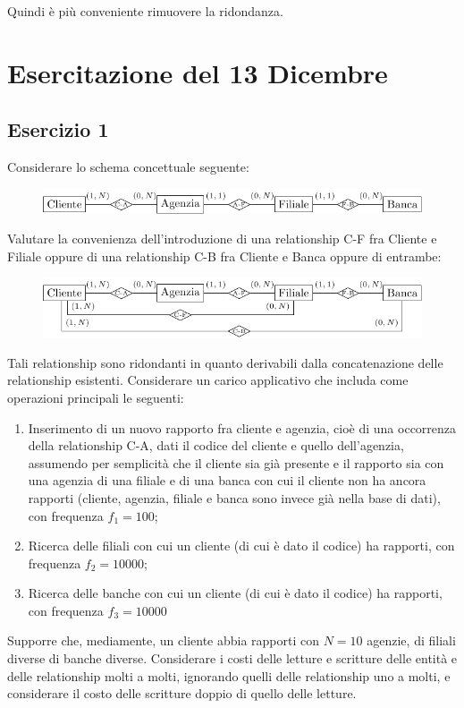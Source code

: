 \documentclass{article}
\numberwithin{equation}{subsection}
\begin{document}
Quindi è più conveniente rimuovere la ridondanza. 

\clearpage

\section{Esercitazione del 13 Dicembre}

\subsection{Esercizio 1}

Considerare lo schema concettuale seguente:
\begin{figure}[H]%
    \centering%
    \includegraphics[scale=1.1]{ridondanza_13-12-24.pdf}%
\end{figure}

Valutare la convenienza dell'introduzione di una relationship C-F fra Cliente e Filiale oppure di una relationship 
C-B fra Cliente e Banca oppure di entrambe:

\begin{figure}[H]%
    \centering%
    \includegraphics[scale=1.1]{ridondanza_aggiunte_13-12-24.pdf}%
\end{figure}

Tali relationship sono ridondanti in quanto derivabili dalla 
concatenazione delle relationship esistenti. Considerare un carico applicativo che includa come operazioni 
principali le seguenti:
\begin{enumerate}
    \item Inserimento di un nuovo rapporto fra cliente e agenzia, cioè di una occorrenza della relationship C-A, 
    dati il codice del cliente e quello dell'agenzia, assumendo per semplicità che il cliente sia già presente e il
    rapporto sia con una agenzia di una filiale e di una banca con cui il cliente non ha ancora rapporti (cliente,
    agenzia, filiale e banca sono invece già nella base di dati), con frequenza $f_1 = 100$;
    \item Ricerca delle filiali con cui un cliente (di cui è dato il codice) ha rapporti, con frequenza $f_2 = 10000$;
    \item Ricerca delle banche con cui un cliente (di cui è dato il codice) ha rapporti, con frequenza $f_3 = 10000$ 
\end{enumerate}
Supporre che, mediamente, un cliente abbia rapporti con $N = 10$ agenzie, di filiali diverse di banche diverse. 
Considerare i costi delle letture e scritture delle entità e delle relationship molti a molti, ignorando quelli delle 
relationship uno a molti, e considerare il costo delle scritture doppio di quello delle letture. 
\end{document}
